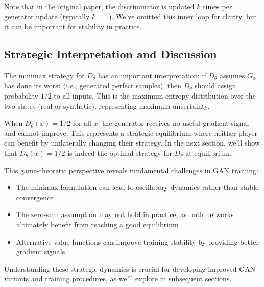 Note that in the original paper, the discriminator is updated $k$ times per generator update (typically $k=1$). We've omitted this inner loop for clarity, but it can be important for stability in practice.

\subsection{Strategic Interpretation and Discussion}

The minimax strategy for $D_\theta$ has an important interpretation: if $D_\theta$ assumes $G_\phi$ has done its worst (i.e., generated perfect samples), then $D_\theta$ should assign probability $1/2$ to all inputs. This is the maximum entropy distribution over the two states (real or synthetic), representing maximum uncertainty.

When $D_\theta(x) = 1/2$ for all $x$, the generator receives no useful gradient signal and cannot improve. This represents a strategic equilibrium where neither player can benefit by unilaterally changing their strategy. In the next section, we'll show that $D_\theta(x) = 1/2$ is indeed the optimal strategy for $D_\theta$ at equilibrium.

This game-theoretic perspective reveals fundamental challenges in GAN training:
\begin{itemize}
  \item The minimax formulation can lead to oscillatory dynamics rather than stable convergence
  \item The zero-sum assumption may not hold in practice, as both networks ultimately benefit from reaching a good equilibrium
  \item Alternative value functions can improve training stability by providing better gradient signals
\end{itemize}

Understanding these strategic dynamics is crucial for developing improved GAN variants and training procedures, as we'll explore in subsequent sections.

